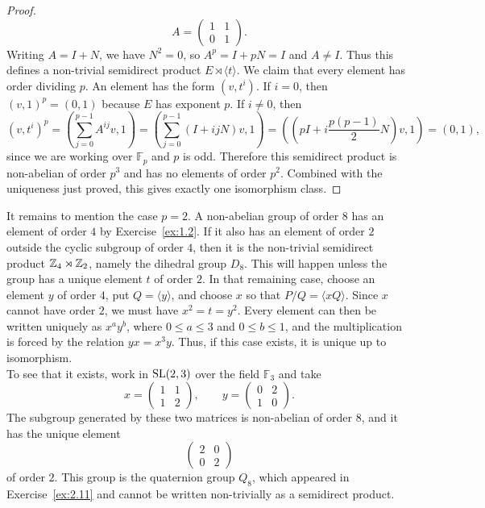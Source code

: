 \documentclass[../Odyssey_Project.tex]{subfiles}
\begin{document}
\begin{proof}
\[
    A=
    \begin{pmatrix}
        1 & 1\\
        0 & 1
    \end{pmatrix}.
\]
Writing $A=I+N$, we have $N^2=0$, so $A^p=I+pN=I$ and $A\neq I$. Thus this defines a non-trivial semidirect product $E\rtimes\langle t\rangle$. We claim that every element has order dividing $p$. An element has the form $(v,t^i)$. If $i=0$, then $(v,1)^p=(0,1)$ because $E$ has exponent $p$. If $i\neq 0$, then
\[
    (v,t^i)^p
    =
    \left(\sum_{j=0}^{p-1}A^{ij}v,1\right)
    =
    \left(\sum_{j=0}^{p-1}(I+ijN)v,1\right)
    =
    \left(\left(pI+i\frac{p(p-1)}{2}N\right)v,1\right)
    =(0,1),
\]
since we are working over $\mathbb{F}_p$ and $p$ is odd. Therefore this semidirect product is non-abelian of order $p^3$ and has no elements of order $p^2$. Combined with the uniqueness just proved, this gives exactly one isomorphism class.
\end{proof}

It remains to mention the case $p=2$. A non-abelian group of order $8$ has an element of order $4$ by Exercise~\ref{ex:1.2}. If it also has an element of order $2$ outside the cyclic subgroup of order $4$, then it is the non-trivial semidirect product $\mathbb{Z}_4 \rtimes \mathbb{Z}_2$, namely the dihedral group $D_8$. This will happen unless the group has a unique element $t$ of order $2$. In that remaining case, choose an element $y$ of order $4$, put $Q=\langle y\rangle$, and choose $x$ so that $P/Q=\langle xQ\rangle$. Since $x$ cannot have order $2$, we must have $x^2=t=y^2$. Every element can then be written uniquely as $x^a y^b$, where $0\leq a\leq 3$ and $0\leq b\leq 1$, and the multiplication is forced by the relation $yx=x^3y$. Thus, if this case exists, it is unique up to isomorphism.\\
To see that it exists, work in $\operatorname{SL}(2,3)$ over the field $\mathbb{F}_3$ and take
\[
    x=
    \begin{pmatrix}
        1 & 1\\
        1 & 2
    \end{pmatrix},
    \qquad
    y=
    \begin{pmatrix}
        0 & 2\\
        1 & 0
    \end{pmatrix}.
\]
The subgroup generated by these two matrices is non-abelian of order $8$, and it has the unique element
\[
    \begin{pmatrix}
        2 & 0\\
        0 & 2
    \end{pmatrix}
\]
of order $2$. This group is the quaternion group $Q_8$, which appeared in Exercise~\ref{ex:2.11} and cannot be written non-trivially as a semidirect product.
\end{document}
